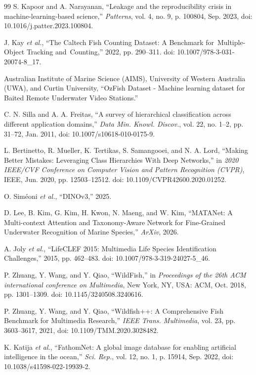 \documentclass[preprint,12pt]{elsarticle}
\begin{document}
\begin{thebibliography}{99}
 S. Kapoor and A. Narayanan, ``Leakage and the reproducibility
crisis in machine-learning-based science,'' \emph{Patterns}, vol. 4, no.
9, p. 100804, Sep. 2023, doi: 10.1016/j.patter.2023.100804.

 J. Kay \emph{et al.}, ``The Caltech Fish Counting Dataset: A
Benchmark for~Multiple-Object Tracking and~Counting,'' 2022, pp.
290--311. doi: 10.1007/978-3-031-20074-8\_17.

 Australian Institute of Marine Science (AIMS), University of
Western Australia (UWA), and Curtin University, ``OzFish Dataset -
Machine learning dataset for Baited Remote Underwater Video Stations.''

 C. N. Silla and A. A. Freitas, ``A survey of hierarchical
classification across different application domains,'' \emph{Data Min.
Knowl. Discov.}, vol. 22, no. 1--2, pp. 31--72, Jan. 2011, doi:
10.1007/s10618-010-0175-9.

 L. Bertinetto, R. Mueller, K. Tertikas, S. Samangooei, and N.
A. Lord, ``Making Better Mistakes: Leveraging Class Hierarchies With
Deep Networks,'' in \emph{2020 IEEE/CVF Conference on Computer Vision
and Pattern Recognition (CVPR)}, IEEE, Jun. 2020, pp. 12503--12512. doi:
10.1109/CVPR42600.2020.01252.

 O. Siméoni \emph{et al.}, ``DINOv3,'' 2025.

 D. Lee, B. Kim, G. Kim, H. Kwon, N. Maeng, and W. Kim,
``MATANet: A Multi-context Attention and Taxonomy-Aware Network for
Fine-Grained Underwater Recognition of Marine Species,'' \emph{ArXiv},
2026.

 A. Joly \emph{et al.}, ``LifeCLEF 2015: Multimedia Life Species
Identification Challenges,'' 2015, pp. 462--483. doi:
10.1007/978-3-319-24027-5\_46.

 P. Zhuang, Y. Wang, and Y. Qiao, ``WildFish,'' in
\emph{Proceedings of the 26th ACM international conference on
Multimedia}, New York, NY, USA: ACM, Oct. 2018, pp. 1301--1309. doi:
10.1145/3240508.3240616.

 P. Zhuang, Y. Wang, and Y. Qiao, ``Wildfish++: A Comprehensive
Fish Benchmark for Multimedia Research,'' \emph{IEEE Trans. Multimedia},
vol. 23, pp. 3603--3617, 2021, doi: 10.1109/TMM.2020.3028482.

 K. Katija \emph{et al.}, ``FathomNet: A global image database
for enabling artificial intelligence in the ocean,'' \emph{Sci. Rep.},
vol. 12, no. 1, p. 15914, Sep. 2022, doi: 10.1038/s41598-022-19939-2.


\end{thebibliography}
\end{document}

